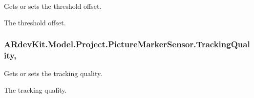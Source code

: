 Gets or sets the threshold offset. 

The threshold offset. \hypertarget{class_a_rdev_kit_1_1_model_1_1_project_1_1_picture_marker_sensor_a312b8ea728d3018c96cb50ceb5c59f0c}{
\subsubsection[{Tracking\-Quality}]{ A\-Rdev\-Kit.\-Model.\-Project.\-Picture\-Marker\-Sensor.\-Tracking\-Quality\hspace{0.3cm}{\ttfamily [get]}, {\ttfamily [set]}}}\label{class_a_rdev_kit_1_1_model_1_1_project_1_1_picture_marker_sensor_a312b8ea728d3018c96cb50ceb5c59f0c}


Gets or sets the tracking quality. 

The tracking quality. 